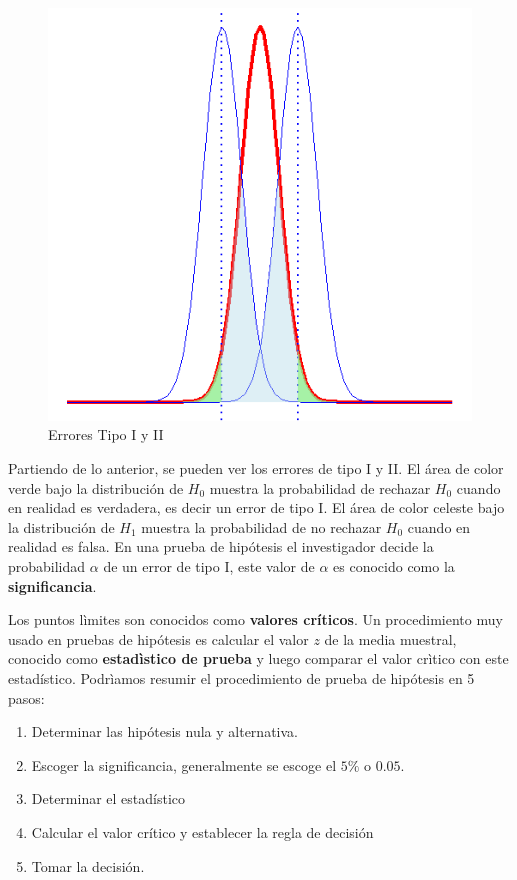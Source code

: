 \documentclass[]{book}
\providecommand{\tightlist}{%
  \setlength{\itemsep}{0pt}\setlength{\parskip}{0pt}}
\begin{document}
\begin{figure}[h!]

{\centering \includegraphics[width=0.6\linewidth]{phtest} 

}

\caption{Errores Tipo I y II}\label{fig:pht}
\end{figure}

Partiendo de lo anterior, se pueden ver los errores de tipo I y II. El área de color verde bajo la distribución de \(H_0\) muestra la probabilidad de rechazar \(H_0\) cuando en realidad es verdadera, es decir un error de tipo I. El área de color celeste bajo la distribución de \(H_1\) muestra la probabilidad de no rechazar \(H_0\) cuando en realidad es falsa. En una prueba de hipótesis el investigador decide la probabilidad \(\alpha\) de un error de tipo I, este valor de \(\alpha\) es conocido como la \textbf{significancia}.

Los puntos lìmites son conocidos como \textbf{valores críticos}. Un procedimiento muy usado en pruebas de hipótesis es calcular el valor \(z\) de la media muestral, conocido como \textbf{estadìstico de prueba} y luego comparar el valor crìtico con este estadístico. Podrìamos resumir el procedimiento de prueba de hipótesis en 5 pasos:

\begin{enumerate}
\def\labelenumi{\arabic{enumi}.}
\tightlist
\item
  Determinar las hipótesis nula y alternativa.
\item
  Escoger la significancia, generalmente se escoge el \(5\%\) o \(0.05\).
\item
  Determinar el estadístico
\item
  Calcular el valor crítico y establecer la regla de decisión
\item
  Tomar la decisión.
\end{enumerate}
\end{document}
